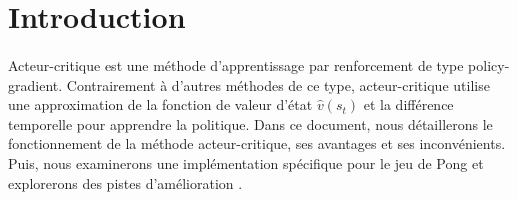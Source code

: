 \section{Introduction}

\paragraph{}
Acteur-critique est une méthode d'apprentissage par renforcement de type policy-gradient.
Contrairement à d'autres méthodes de ce type, acteur-critique utilise 
une approximation de la fonction de valeur d'état $\hat{v}(s_t)$ et la différence temporelle
pour apprendre la politique. Dans ce document,
nous détaillerons le fonctionnement de la méthode acteur-critique,
ses avantages et ses inconvénients. Puis,
nous examinerons une implémentation spécifique pour le jeu de Pong et explorerons des pistes d'amélioration \cite{PongGithub}.


